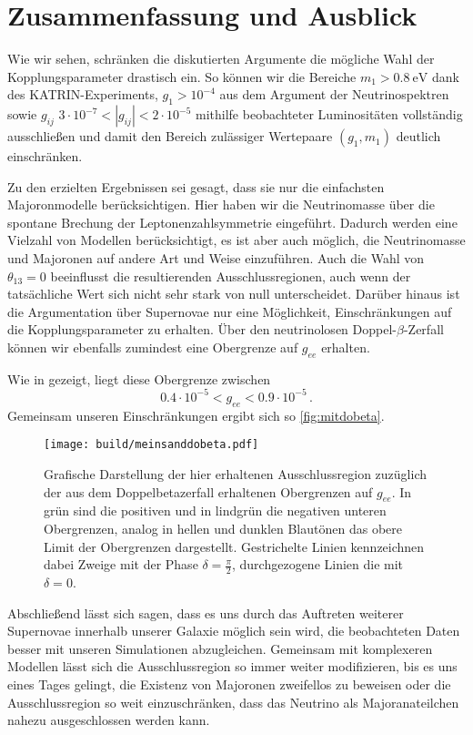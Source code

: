 \chapter{Zusammenfassung und Ausblick}

Wie wir sehen, schränken die diskutierten Argumente die mögliche Wahl der Kopplungsparameter drastisch ein.
So können wir die Bereiche $m_1 > \SI{0.8}{\eV}$ dank des KATRIN-Experiments, $g_1 > 10^{-4}$ aus dem Argument der Neutrinospektren sowie $g_{i j}$ $3 \cdot 10^{-7} < |g_{i j}| < 2 \cdot 10^{-5}$
mithilfe beobachteter Luminositäten vollständig ausschließen und damit den Bereich zulässiger Wertepaare
$(g_1,m_1)$ deutlich einschränken.

Zu den erzielten Ergebnissen sei gesagt, dass sie nur die einfachsten Majoronmodelle berücksichtigen.
Hier haben wir die Neutrinomasse über die spontane Brechung der Leptonenzahlsymmetrie eingeführt.
Dadurch werden eine Vielzahl von Modellen berücksichtigt, es ist aber auch möglich, die Neutrinomasse und Majoronen auf andere Art und Weise einzuführen.
Auch die Wahl von $\theta_{1 3} = 0$ beeinflusst die resultierenden Ausschlussregionen, auch wenn der tatsächliche Wert sich nicht sehr stark von null unterscheidet.
Darüber hinaus ist die Argumentation über Supernovae nur eine Möglichkeit, Einschränkungen auf die Kopplungsparameter zu erhalten.
Über den neutrinolosen Doppel-$\beta$-Zerfall können wir ebenfalls zumindest eine Obergrenze auf $g_{ee}$ erhalten.

Wie in \cite{hauhau} gezeigt, liegt diese Obergrenze zwischen
\begin{equation}
    \num{0.4} \cdot 10^{-5} < g_{ee} < \num{0.9} \cdot 10^{-5} \,.
    \label{eq:g_eedoppelbeta}
\end{equation} 
Gemeinsam unseren Einschränkungen ergibt sich so \autoref{fig:mitdobeta}.
\begin{figure}[H]
    \centering
    \texttt{[image: build/meinsanddobeta.pdf]}
    \caption{Grafische Darstellung der hier erhaltenen Ausschlussregion zuzüglich der aus dem Doppelbetazerfall erhaltenen Obergrenzen auf $g_{ee}$. In grün sind die positiven und in lindgrün die negativen
            unteren Obergrenzen, analog in hellen und dunklen Blautönen das obere Limit der Obergrenzen dargestellt. Gestrichelte Linien kennzeichnen dabei Zweige mit der Phase $\delta = \frac{\pi}{2}$, durchgezogene Linien die mit $\delta = 0$.}
    \label{fig:mitdobeta}
\end{figure}

Abschließend lässt sich sagen, dass es uns durch das Auftreten weiterer Supernovae innerhalb unserer Galaxie möglich sein wird, die beobachteten Daten besser mit unseren Simulationen abzugleichen.
Gemeinsam mit komplexeren Modellen lässt sich die Ausschlussregion so immer weiter modifizieren, bis es uns eines Tages gelingt, die Existenz von Majoronen zweifellos zu beweisen oder die
Ausschlussregion so weit einzuschränken, dass das Neutrino als Majoranateilchen nahezu ausgeschlossen werden kann.



